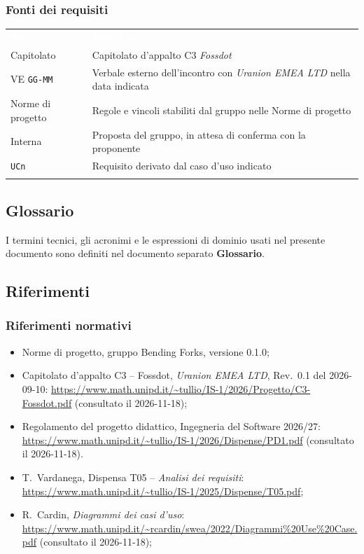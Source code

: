 \documentclass[12pt,a4paper]{article}
\newcommand{\tightlist}{\setlength{\itemsep}{1pt}\setlength{\parskip}{0pt}}
\newcommand{\thc}[1]{\textcolor{white}{\textbf{#1}}}
\newcommand{\rl}{\\ \arrayrulecolor{bfline}\hline}
\begin{document}
\subsubsection{Fonti dei requisiti}
\begin{center}
\begin{tabularx}{\linewidth}{>{\raggedright\arraybackslash}p{3.6cm}X}
\rowcolor{bfblue}\thc{Fonte} & \thc{Significato} \\
Capitolato & Capitolato d'appalto C3 \emph{Fossdot} \rl
VE \texttt{GG-MM} & Verbale esterno dell'incontro con \emph{Uranion EMEA LTD} nella data indicata \rl
Norme di progetto & Regole e vincoli stabiliti dal gruppo nelle Norme di progetto \rl
Interna & Proposta del gruppo, in attesa di conferma con la proponente \rl
\texttt{UCn} & Requisito derivato dal caso d'uso indicato \rl
\end{tabularx}
\end{center}
 
\subsection{Glossario}
I termini tecnici, gli acronimi e le espressioni di dominio usati nel presente documento sono definiti nel documento separato \textbf{Glossario}.
 
\subsection{Riferimenti}
 
\subsubsection{Riferimenti normativi}
\begin{itemize}
\tightlist
\item Norme di progetto, gruppo Bending Forks, versione 0.1.0;
\item Capitolato d'appalto C3 -- Fossdot, \emph{Uranion EMEA LTD}, Rev.\ 0.1 del 2026-09-10: \url{https://www.math.unipd.it/~tullio/IS-1/2026/Progetto/C3-Fossdot.pdf} (consultato il 2026-11-18);
\item Regolamento del progetto didattico, Ingegneria del Software 2026/27: \url{https://www.math.unipd.it/~tullio/IS-1/2026/Dispense/PD1.pdf} (consultato il 2026-11-18).
\item T.\ Vardanega, Dispensa T05 -- \emph{Analisi dei requisiti}: \url{https://www.math.unipd.it/~tullio/IS-1/2025/Dispense/T05.pdf};
\item R.\ Cardin, \emph{Diagrammi dei casi d'uso}: \url{https://www.math.unipd.it/~rcardin/swea/2022/Diagrammi%20Use%20Case.pdf} (consultato il 2026-11-18);
\end{itemize}
 
\end{document}
